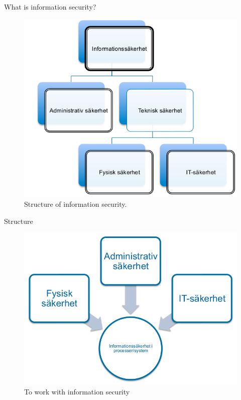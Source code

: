 \documentclass{beamer}
\begin{document}
\begin{frame}{What is information security?}
  \begin{figure}
    \includegraphics[height=0.7\textheight]{infosak-struktur.png}
    \caption{Structure of information security.}
  \end{figure}
\end{frame}

\begin{frame}{Structure}
  \begin{figure}
    \includegraphics[height=0.7\textheight]{infosak-process.png}
    \caption{To work with information security}
  \end{figure}
\end{frame}
\end{document}
